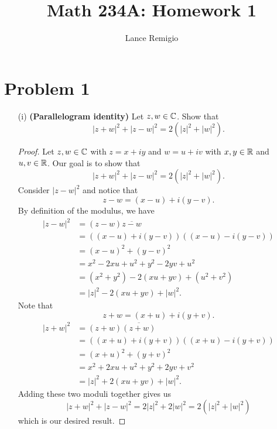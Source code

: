 \documentclass[a4paper]{article}
\title{Math 234A: Homework 1}
\author{Lance Remigio}
\begin{document}
   \maketitle 

    \section*{Problem 1}  
        \begin{enumerate}
            \item[(i)] \textbf{(Parallelogram identity)} Let \( z,w \in \mathbb{C}  \). Show that 
                \[  | z + w  |^{2} + | z - w  |^{2} = 2 (| z  |^{2} + | w |^{2}).  \]
                \begin{proof}
                Let \( z,w \in \mathbb{C}  \) with \( z = x + iy  \) and \( w = u + iv  \) with \( x,y \in \mathbb{R}  \) and \( u,v \in \mathbb{R}  \). Our goal is to show that  
                \[   | z + w  |^{2} + | z - w  |^{2} = 2 (| z  |^{2} + | w |^{2}).    \]
                Consider \( | z - w  |^{2} \) and notice that 
                \[  z - w = (x - u) + i(y - v). \]
                By definition of the modulus, we have 
                \begin{align*}
                    | z - w  |^{2} &= (z - w) \overline{z - w} \\
                                   &= ((x-u) + i(y-v))((x-u) - i(y -v)) \\
                                   &= (x - u)^{2} + (y -v)^{2} \\
                                   &= x^{2} - 2xu + u^{2} + y^{2} - 2yv + u^{2} \\
                                   &= (x^{2} + y^{2}) - 2(xu + yv) + (u^{2} + v^{2}) \\
                                   &= | z |^{2} - 2(xu + yv) + | w |^{2}.
                \end{align*}
                Note that 
                \[  z + w = (x+u) + i(y+v). \]
                \begin{align*}
                    | z + w  |^{2} &= (z + w) \overline{(z+w)}   \\
                                   &= ((x+u) + i(y+v))((x+u) - i(y+v)) \\
                                   &= (x+u)^{2} + (y +v)^{2} \\
                                   &= x^{2} + 2xu + u^{2} + y^{2} + 2yv + v^{2} \\ 
                                   &= | z |^{2} + 2(xu + yv) + | w  |^{2}.
                \end{align*}
                Adding these two moduli together gives us
                \[ | z + w  |^{2} + | z - w  |^{2} = 2 | z  |^{2} + 2 | w |^{2} = 2 (| z | ^{2} + | w |^{2})    \]
                which is our desired result.


\end{proof}
\end{enumerate}
\end{document}
